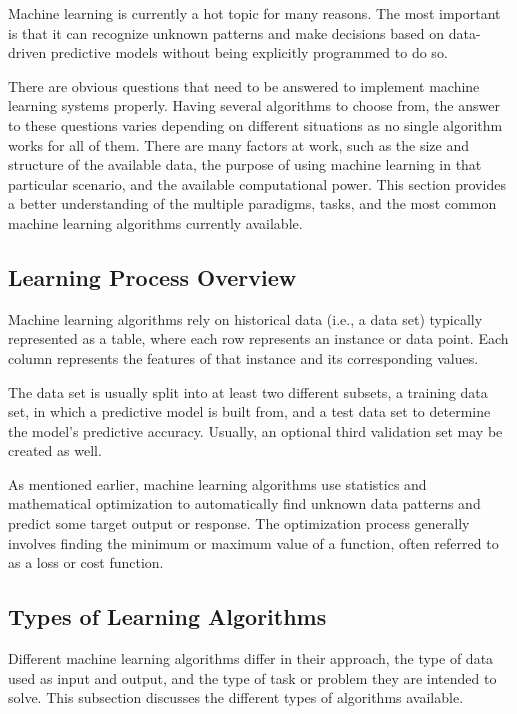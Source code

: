 Machine learning is currently a hot topic for many reasons. The most important is that it can recognize unknown patterns and make decisions based on data-driven predictive models without being explicitly programmed to do so.

There are obvious questions that need to be answered to implement machine learning systems properly. Having several algorithms to choose from, the answer to these questions varies depending on different situations as no single algorithm works for all of them. There are many factors at work, such as the size and structure of the available data, the purpose of using machine learning in that particular scenario, and the available computational power. This section provides a better understanding of the multiple paradigms, tasks, and the most common machine learning algorithms currently available.

\subsection{Learning Process Overview}

Machine learning algorithms rely on historical data (i.e., a data set) typically represented as a table, where each row represents an instance or data point. Each column represents the features of that instance and its corresponding values. 

The data set is usually split into at least two different subsets, a training data set, in which a predictive model is built from, and a test data set to determine the model's predictive accuracy. Usually, an optional third validation set may be created as well.

As mentioned earlier, machine learning algorithms use statistics and mathematical optimization to automatically find unknown data patterns and predict some target output or response. The optimization process generally involves finding the minimum or maximum value of a function, often referred to as a loss or cost function.

\subsection{Types of Learning Algorithms}

Different machine learning algorithms differ in their approach, the type of data used as input and output, and the type of task or problem they are intended to solve. This subsection discusses the different types of algorithms available.

